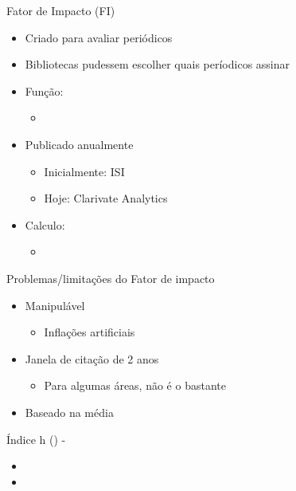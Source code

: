 \documentclass[bigger]{beamer}
\begin{document}
\begin{frame}[label={sec:org67b6268}]{Fator de Impacto (FI)}
\begin{itemize}
\item Criado para avaliar periódicos \parencite{garfield1963}
\item Bibliotecas pudessem escolher quais períodicos assinar

\item Função:
\begin{itemize}
\item 
\end{itemize}

\item Publicado anualmente
\begin{itemize}
\item Inicialmente: ISI
\item Hoje: Clarivate Analytics
\end{itemize}

\item Calculo:
\begin{itemize}
\item 
\end{itemize}
\end{itemize}
\end{frame}

\begin{frame}[label={sec:org7e802bf}]{Problemas/limitações do Fator de impacto}
\begin{itemize}
\item Manipulável
\begin{itemize}
\item Inflações artificiais
\end{itemize}

\item Janela de citação de 2 anos
\begin{itemize}
\item Para algumas áreas, não é o bastante
\end{itemize}

\item Baseado na média
\end{itemize}
\end{frame}


\begin{frame}[label={sec:org8f9000c}]{Índice h () - \parencite{hirsch2005}}
\begin{itemize}
\item 

\item 
\end{itemize}
\end{frame}
\end{document}
